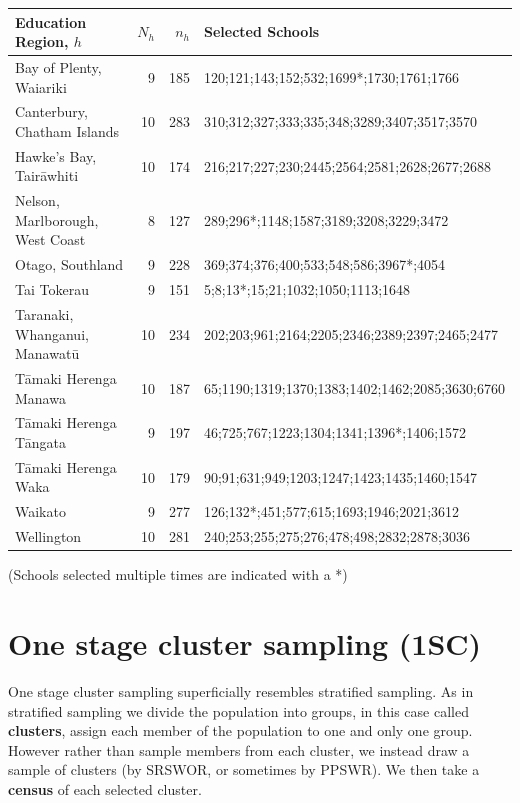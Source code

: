 \documentclass[
]{book}
\begin{document}
\begin{table}
\centering
\begin{tabular}[t]{l|r|r|l}
\hline
Education Region, $h$ & $N_h$ & $n_h$ & Selected Schools\\
\hline
Bay of Plenty, Waiariki & 9 & 185 & 120;121;143;152;532;1699*;1730;1761;1766\\
\hline
Canterbury, Chatham Islands & 10 & 283 & 310;312;327;333;335;348;3289;3407;3517;3570\\
\hline
Hawke's Bay, Tairāwhiti & 10 & 174 & 216;217;227;230;2445;2564;2581;2628;2677;2688\\
\hline
Nelson, Marlborough, West Coast & 8 & 127 & 289;296*;1148;1587;3189;3208;3229;3472\\
\hline
Otago, Southland & 9 & 228 & 369;374;376;400;533;548;586;3967*;4054\\
\hline
Tai Tokerau & 9 & 151 & 5;8;13*;15;21;1032;1050;1113;1648\\
\hline
Taranaki, Whanganui, Manawatū & 10 & 234 & 202;203;961;2164;2205;2346;2389;2397;2465;2477\\
\hline
Tāmaki Herenga Manawa & 10 & 187 & 65;1190;1319;1370;1383;1402;1462;2085;3630;6760\\
\hline
Tāmaki Herenga Tāngata & 9 & 197 & 46;725;767;1223;1304;1341;1396*;1406;1572\\
\hline
Tāmaki Herenga Waka & 10 & 179 & 90;91;631;949;1203;1247;1423;1435;1460;1547\\
\hline
Waikato & 9 & 277 & 126;132*;451;577;615;1693;1946;2021;3612\\
\hline
Wellington & 10 & 281 & 240;253;255;275;276;478;498;2832;2878;3036\\
\hline
\end{tabular}
\end{table}

(Schools selected multiple times are indicated with a *)

\section{One stage cluster sampling (1SC)}\label{one-stage-cluster-sampling-1sc}

One stage cluster sampling superficially resembles stratified sampling.
As in stratified sampling we divide the population into groups, in this
case called \textbf{clusters}, assign each member of the population to one and only one group.
However rather than sample members from each cluster, we instead draw a sample
of clusters (by SRSWOR, or sometimes by PPSWR). We then take a \textbf{census} of
each selected cluster.
\end{document}
